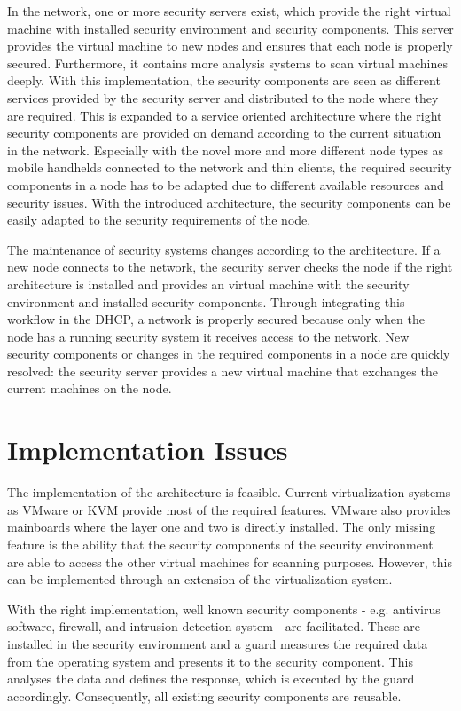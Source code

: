 \documentclass[conference,10pt,a4]{IEEEtran}
\begin{document}
In the network, one or more security servers exist, which provide the right virtual machine with installed security environment and security components. This server provides the virtual machine to new nodes and ensures that each node is properly secured. Furthermore, it contains more analysis systems to scan virtual machines deeply. With this implementation, the security components are seen as different services provided by the security server and distributed to the node where they are required. This is expanded to a service oriented architecture where the right security components are provided on demand according to the current situation in the network. Especially with the novel more and more different node types as mobile handhelds connected to the network and thin clients, the required security components in a node has to be adapted due to different available resources and security issues. With the introduced architecture, the security components can be easily adapted to the security requirements of the node.

The maintenance of security systems changes according to the architecture. If a new node connects to the network, the security server checks the node if the right architecture is installed and provides an virtual machine with the security environment and installed security components. Through integrating this workflow in the DHCP, a network is properly secured because only when the node has a running security system it receives access to the network. New security components or changes in the required components in a node are quickly resolved: the security server provides a new virtual machine that exchanges the current machines on the node. 

\section{Implementation Issues}
The implementation of the architecture is feasible. Current virtualization systems as VMware or KVM provide most of the required features. VMware also provides mainboards where the layer one and two is directly installed. The only missing feature is the ability that the security components of the security environment are able to access the other virtual machines for scanning purposes. However, this can be implemented through an extension of the virtualization system.  

With the right implementation, well known security components - e.g. antivirus software, firewall, and intrusion detection system - are facilitated. These are installed in the security environment and a guard measures the required data from the operating system and presents it to the security component. This analyses the data and defines the response, which is executed by the guard accordingly. Consequently, all existing security components are reusable.
\end{document}
